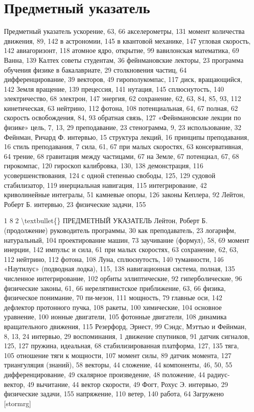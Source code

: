 \documentclass[10pt,oneside]{article}
\begin{document}
\section*{Предметный указатель}
\label{tips-sec-15-предметный-указатель}
Предметный указатель ускорение, 63, 66 акселерометры, 131 момент количества движения, 89, 142 в астрономии, 145 в квантовой механике, 147 угловая скорость, 142 авиагоризонт, 118 атомное ядро, открытие, 99 вавилонская математика, 69 Ванна, 139 Калтех советы студентам, 36 фейнмановские лекторы, 23 программа обучения физике в бакалавриате, 29 столкновения частиц, 64 дифференцирование, 39 векторов, 49 гирополукомпас, 117 диск, вращающийся, 142 Земля вращение, 139 прецессия, 141 нутация, 145 сплюснутость, 140 электричество, 68 электрон, 147 энергия, 62 сохранение, 62, 63, 84, 85, 93, 112 кинетическая, 63 нейтрино, 112 фотона, 108 потенциальная, 64, 67 полная, 62 скорость освобождения, 84, 93 обратная связь, 127 «Фейнмановские лекции по физике» цель, 7, 13, 29 преподавание, 23 стенограмма, 9, 23 использование, 32 Фейнман, Ричард Ф. интервью, 15 структура лекций, 16 принципы преподавания, 16 стиль преподавания, 7 сила, 61, 67 при малых скоростях, 63 консервативная, 64 трение, 68 гравитация между частицами, 67 на Земле, 67 потенциал, 67, 68 гирокомпас, 120 гироскоп калибровка, 130, 138 демонстрация, 116 усовершенствования, 124 с одной степенью свободы, 125, 129 судовой стабилизатор, 119 инерциальная навигация, 115 интегрирование, 42 криволинейные интегралы, 51 камневые опоры, 126 законы Кеплера, 92 Лейтон, Роберт Б. интервью, 23 физические задачи, 155\par

1 8 2 \textbackslash{}textbullet\{\} ПРЕДМЕТНЫЙ УКАЗАТЕЛЬ Лейтон, Роберт Б. (продолжение) руководитель программы, 30 как преподаватель, 23 логарифм, натуральный, 104 проектирование машин, 73 заучивание (формул), 58, 69 момент инерции, 142 импульс и сила, 61 при малых скоростях, 63 сохранение, 62, 63, 112 нейтрино, 112 фотона, 108 Луна, сплюснутость, 140 туманности, 146 «Наутилус» (подводная лодка), 115, 138 навигационная система, полная, 135 численное интегрирование, 102 орбиты эллиптические, 92 гиперболические, 96 физические законы, 61, 66 нерелятивистское приближение, 63, 66 физика, физическое понимание, 70 пи-мезон, 111 мощность, 79 главные оси, 142 дефлектор протонного пучка, 108 ракеты, 100 химические, 104 основное уравнение, 100 ионные двигатели, 105 фотонные двигатели, 108 динамика вращательного движения, 115 Резерфорд, Эрнест, 99 Сэндс, Мэттью и Фейнман, 8, 13, 24 интервью, 29 воспоминания, 1 движение спутников, 91 датчик сигналов, 125, 127 пружина, идеальная, 68 стабилизированная платформа, 127, 135 тяга, 105 отношение тяги к мощности, 107 момент силы, 89 датчик момента, 127 триангуляция (знаний), 58 векторы, 44 сложение, 44 компоненты, 46, 50, 55 дифференцирование, 49 скалярное произведение, 48 положение, 44 радиус-вектор, 49 вычитание, 44 вектор скорости, 49 Фогт, Рохус Э. интервью, 29 физические задачи, 155 напряжение, 110 ветер, 140 работа, 64 Загружено [stormrg]\par
\end{document}
